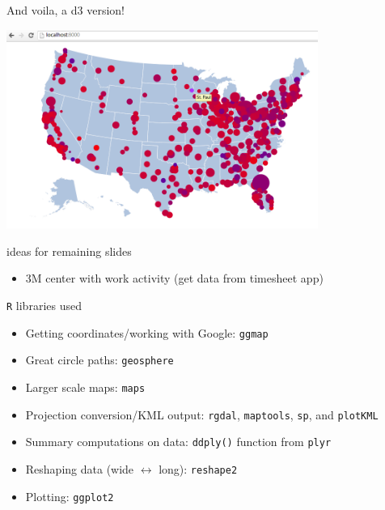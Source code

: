 \documentclass[sans,aspectratio=169,presentation,bigger,fleqn]{beamer}
\begin{document}
\begin{frame}[label=sec-32]{And voila, a d3 version!}
\begin{center}
\includegraphics[height=6.5cm]{./img/transpo-d3.png}
\end{center}
\end{frame}
\begin{frame}[label=sec-33]{ideas for remaining slides}
\begin{itemize}
\item 3M center with work activity (get data from timesheet app)
\end{itemize}
\end{frame}
\begin{frame}[fragile,label=sec-34]{\texttt{R} libraries used}
 \begin{itemize}
\item Getting coordinates/working with Google: \texttt{ggmap}
\item Great circle paths: \texttt{geosphere}
\item Larger scale maps: \texttt{maps}
\item Projection conversion/KML output: \texttt{rgdal}, \texttt{maptools}, \texttt{sp}, and \texttt{plotKML}
\item Summary computations on data: \texttt{ddply()} function from \texttt{plyr}
\item Reshaping data (wide \(\leftrightarrow\) long): \texttt{reshape2}
\item Plotting: \texttt{ggplot2}
\end{itemize}
\end{frame}
\end{document}
